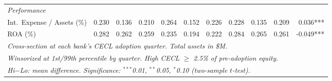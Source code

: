\begin{tabular}{lrrr rrr rrr r}
  \midrule
  \emph{Performance} & & & & & & & & & & \\
  \hspace{1em}Int.\ Expense / Assets (\%) & 0.230 & 0.136 & 0.210 & 0.264 & 0.152 & 0.226 & 0.228 & 0.135 & 0.209 & 0.036*** \\
  \hspace{1em}ROA (\%) & 0.282 & 0.262 & 0.259 & 0.235 & 0.194 & 0.222 & 0.284 & 0.265 & 0.261 & -0.049*** \\
  \midrule
  \midrule
  \multicolumn{11}{l}{\emph{Cross-section at each bank's CECL adoption quarter. Total assets in \$M.}} \\
  \multicolumn{11}{l}{\emph{Winsorized at 1st/99th percentile by quarter. High CECL $\geq$ 2.5\% of pre-adoption equity.}} \\
  \multicolumn{11}{l}{\emph{Hi$-$Lo: mean difference. Significance: $^{***}$0.01, $^{**}$0.05, $^{*}$0.10 (two-sample $t$-test).}} \\
\end{tabular}
\par\endgroup
